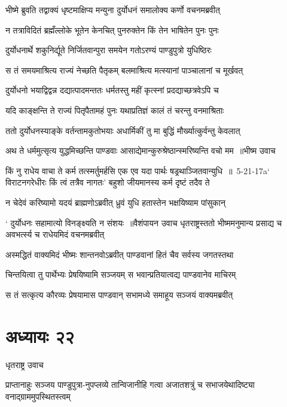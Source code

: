 \twolineshloka
{भीष्मे ब्रुवति तद्वाक्यं धृष्टमाक्षिप्य मन्युना}
{दुर्योधनं समालोक्य कर्णो वचनमब्रवीत्}


\twolineshloka
{न तत्राविदितं ब्रह्मँल्लोके भूतेन केनचित्}
{पुनरुक्तेन किं तेन भाषितेन पुनः पुनः}


\twolineshloka
{दुर्योधनार्थे शकुनिर्द्यूते निर्जितवान्पुरा}
{समयेन गतोऽरण्यं पाण्डुपुत्रो युधिष्ठिरः}


\twolineshloka
{स तं समयमाश्रित्य राज्यं नेच्छति पैतृकम्}
{बलमाश्रित्य मत्स्यानां पाञ्चालानां च मूर्खवत्}


\twolineshloka
{दुर्योधनो भयाद्विद्वन्न दद्यात्पादमन्ततः}
{धर्मतस्तु महीं कृत्स्नां प्रदद्याच्छत्रवेऽपि च}


\twolineshloka
{यदि काङ्क्षन्ति ते राज्यं पितृपैतामहं पुनः}
{यथाप्रतिज्ञं कालं तं चरन्तु वनमाश्रिताः}


\twolineshloka
{ततो दुर्योधनस्याङ्के वर्तन्तामकुतोभयाः}
{अधार्मिकीं तु मा बुद्धिं मौर्ख्यात्कुर्वन्तु केवलात्}


\threelineshloka
{अथ ते धर्ममुत्सृत्य युद्धमिच्छन्ति पाण्डवाः}
{आसाद्येमान्कुरुश्रेष्ठान्स्मरिष्यन्ति वचो मम ॥भीष्म उवाच}
{}


\threelineshloka
{किं नु राधेय वाचा ते कर्म तत्स्मर्तुमर्हसि}
{एक एव यदा पार्थः षड्रथाञ्जितवान्युधि ॥ 5-21-17a` विराटनगरेधीरः किं त्वं तत्रैव नागतः'}
{बहुशो जीयमानस्य कर्म दृष्टं तदैव ते}


\threelineshloka
{न चेदेवं करिष्यामो यदयं ब्राह्मणोऽब्रवीत्}
{ध्रुवं युधि हतास्तेन भक्षयिष्याम पांसुकान्}
{}


\threelineshloka
{` दुर्योधनः सहामात्यो विनङ्क्ष्यति न संशयः ॥वैशंपायन उवाच}
{धृतराष्ट्रस्ततो भीष्ममनुमान्य प्रसाद्य च}
{अवभर्त्स्य च राधेयमिदं वचनमब्रवीत्}


\twolineshloka
{अस्मद्धितं वाक्यमिदं भीष्मः शान्तनवोऽब्रवीत्}
{पाण्डवानां हितं चैव सर्वस्य जगतस्तथा}


\twolineshloka
{चिन्तयित्वा तु पार्थेभ्यः प्रेषयिष्यामि सञ्जयम्}
{स भवान्प्रतियात्वद्य पाण्डवानेव माचिरम्}


\twolineshloka
{स तं सत्कृत्य कौरव्यः प्रेषयामास पाण्डवान्}
{सभामध्ये समाहूय सञ्जयं वाक्यमब्रवीत्}


\chapter{अध्यायः २२}
\twolineshloka
{धृतराष्ट्र उवाच}
{}


\twolineshloka
{प्राप्तानाहुः सञ्जय पाण्डुपुत्रा-नुपप्लव्ये तान्विजानीहि गत्वा}
{अजातशत्रुं च सभाजयेथादिष्ट्या वनाद्ग्राममुपस्थितस्त्वम्}


